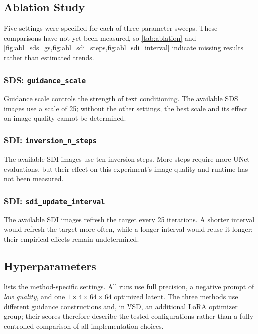 \subsection{Ablation Study}
\label{sec:ablation}


Five settings were specified for each of three parameter sweeps. These comparisons have not yet been measured, so \cref{tab:ablation} and \cref{fig:abl_sds_gs,fig:abl_sdi_steps,fig:abl_sdi_interval} indicate missing results rather than estimated trends.

\subsubsection{SDS: \texttt{guidance\_scale}}
\label{sec:abl_sds_gs}
Guidance scale controls the strength of text conditioning. The available SDS images use a scale of 25; without the other settings, the best scale and its effect on image quality cannot be determined.

\subsubsection{SDI: \texttt{inversion\_n\_steps}}
\label{sec:abl_sdi_steps}
The available SDI images use ten inversion steps. More steps require more UNet evaluations, but their effect on this experiment's image quality and runtime has not been measured.

\subsubsection{SDI: \texttt{sdi\_update\_interval}}
\label{sec:abl_sdi_interval}
The available SDI images refresh the target every 25 iterations. A shorter interval would refresh the target more often, while a longer interval would reuse it longer; their empirical effects remain undetermined.

\subsection{Hyperparameters}
\label{sec:hparams}


 lists the method-specific settings. All runs use full precision, a negative prompt of \emph{low quality}, and one $1\times4\times64\times64$ optimized latent. The three methods use different guidance constructions and, in VSD, an additional LoRA optimizer group; their scores therefore describe the tested configurations rather than a fully controlled comparison of all implementation choices.
